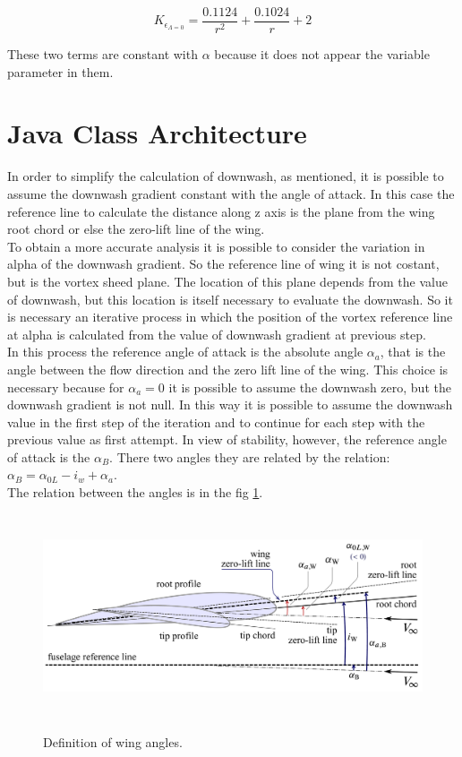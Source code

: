 \begin{equation}
K_{\epsilon _{\Lambda=0}} = \frac{ 0.1124 }{r^2} + \frac{0.1024}{r} +2
\end{equation}

These two terms are constant with $\alpha$ because  it does not appear the variable parameter in them.


\section{Java Class Architecture}

In order to simplify the calculation of downwash, as mentioned, it is possible to assume the downwash gradient constant with the angle of attack. In this case the reference line to calculate the distance along z axis is the plane from the wing root chord or else the zero-lift line of the wing.\\
To obtain a more accurate analysis it is possible to consider the variation in alpha of the downwash gradient. So the reference line of wing it is not costant, but is the vortex sheed plane. The location of this plane depends from the value of downwash, but this location is itself necessary to evaluate the downwash. So it is necessary an iterative process in which the position of the vortex reference line at alpha is calculated from the value of downwash gradient at previous step.\\ 

In this process the reference angle of attack is the absolute angle $\alpha_a$, that is the angle between the flow direction and the zero lift line of the wing. This choice is necessary because for $\alpha_a = 0$ it is possible to assume the downwash zero, but the downwash gradient is not null. In this way it is possible to assume the downwash value in the first step of the iteration and to continue for each step with the previous value as first attempt.
In view of stability, however, the reference angle of attack is the $\alpha_B$. There two angles they are related by the relation: $ \alpha_B =\alpha_{0L} - i_w + \alpha_a $. \\The relation between the angles is in the fig \ref{anglesDef}.

\begin{figure}[H]
\centering
{\includegraphics[height=6cm]{Immagini/Wing_Alpha_Zero_List.pdf}} 
\caption{Definition of wing angles.}
\label{anglesDef}
\end{figure} 


